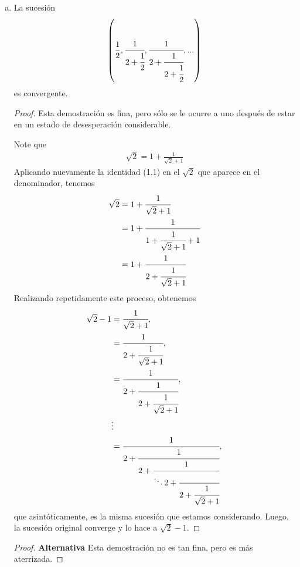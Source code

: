 \begin{itemize}[leftmargin=*]
\begin{enumerate}[a)]
        \begin{proof}
            Sea  $\tau(n)=\displaystyle\sum_{j\mid n}1$, en efecto $0\leq  v(n)\leq\tau(n)$, para todo $n\in \Z^+$, ahora note que $\tau(n)\leq 2\sqrt{n}$, ya que para cada divisor de $n$ menor igual que $\sqrt{n}$ hay exactamente un divisor mayor igual que $\sqrt{n}$, es decir, si $j\mid n$ y $j\leq \sqrt{n}$, entonces $\dfrac{n}{j}\geq \sqrt{n}$ y además $\dfrac{n}{j}\mid n$. Luego:

            \begin{align*}
                0\leq \lim_{n\to \infty} \dfrac{v(n)}{n}\leq \lim_{n\to\infty}\dfrac{2\sqrt{n}}{n}=0
            \end{align*}
        \end{proof}
        
        \item La sucesión
        \begin{align*}
            \left(\frac{1}{2},\cfrac{1}{2+\cfrac{1}{2}},\cfrac{1}{2+\cfrac{1}{2+\cfrac{1}{2}}},...\right)
        \end{align*}
        es convergente.
        \begin{proof}
            Esta demostración es fina, pero sólo se le ocurre a uno después de estar en un estado de desesperación considerable.
            
            Note que
            \begin{align}
                \sqrt{2}=1+\frac{1}{\sqrt{2}+1}
            \end{align}
            Aplicando nuevamente la identidad (1.1) en el $\sqrt{2}$ que aparece en el denominador, tenemos
            \begin{align*}
                \sqrt{2}&=1+\cfrac{1}{\sqrt{2}+1}\\
                &=1+\cfrac{1}{1+\cfrac{1}{\sqrt{2}+1}+1}\\
                &=1+\cfrac{1}{2+\cfrac{1}{\sqrt{2}+1}}
            \end{align*}
            Realizando repetidamente este proceso, obtenemos
            \begin{align*}
                \sqrt{2}-1&=\cfrac{1}{\sqrt{2}+1},\\
                &=\cfrac{1}{2+\cfrac{1}{\sqrt{2}+1}},\\
                &=\cfrac{1}{2+\cfrac{1}{2+\cfrac{1}{\sqrt{2}+1}}},\\
                &\vdots\\
                &=\cfrac{1}{2+\cfrac{1}{2+\cfrac{1}{\ddots 2+ \cfrac{\empty}{2+\cfrac{1}{\sqrt{2}+1}}}}},
            \end{align*}
            que asintóticamente, es la misma sucesión que estamos considerando. Luego, la sucesión original converge y lo hace a $\sqrt{2}-1$.
        \end{proof}
        \begin{proof}
            \textbf{Alternativa} Esta demostración no es tan fina, pero es más aterrizada. 


\end{proof}
\end{enumerate}
\end{itemize}
